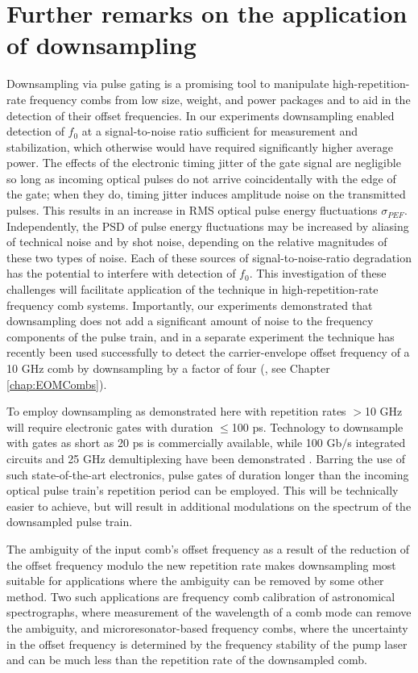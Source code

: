 \section{Further remarks on the application of downsampling}\label{sec:PPConclusion}
Downsampling via pulse gating is a promising tool to manipulate high-repetition-rate frequency combs from low size, weight, and power packages and to aid in the detection of their offset frequencies. In our experiments downsampling enabled detection of $f_0$ at a signal-to-noise ratio sufficient for measurement and stabilization, which otherwise would have required significantly higher average power. The effects of the electronic timing jitter of the gate signal are negligible so long as incoming optical pulses do not arrive coincidentally with the edge of the gate; when they do, timing jitter induces amplitude noise on the transmitted pulses. This results in an increase in RMS optical pulse energy fluctuations $\sigma_{PEF}$. Independently, the PSD of pulse energy fluctuations may be increased by aliasing of technical noise and by shot noise, depending on the relative magnitudes of these two types of noise. Each of these sources of signal-to-noise-ratio degradation has the potential to interfere with detection of $f_0$. This investigation of these challenges will facilitate application of the technique in high-repetition-rate frequency comb systems. Importantly, our experiments demonstrated that downsampling does not add a significant amount of noise to the frequency components of the pulse train, and in a separate experiment the technique has recently been used successfully to detect the carrier-envelope offset frequency of a 10 GHz comb by downsampling by a factor of four (\cite{Beha2017}, see Chapter \ref{chap:EOMCombs}).

To employ downsampling as demonstrated here with repetition rates $>$10 GHz will require electronic gates with duration $\leq$100 ps. Technology to downsample with gates as short as 20 ps is commercially available, while 100 Gb$/$s integrated circuits and 25 GHz demultiplexing have been demonstrated \cite{Driad2011,Ferenci2012}. Barring the use of such state-of-the-art electronics, pulse gates of duration longer than the incoming optical pulse train's repetition period can be employed.  This will be technically easier to achieve, but will result in additional modulations on the spectrum of the downsampled pulse train.

The ambiguity of the input comb's offset frequency as a result of the reduction of the offset frequency modulo the new repetition rate makes downsampling most suitable for applications where the ambiguity can be removed by some other method.  Two such applications are frequency comb calibration of astronomical spectrographs, where measurement of the wavelength of a comb mode can remove the ambiguity, and microresonator-based frequency combs, where the uncertainty in the offset frequency is determined by the frequency stability of the pump laser and can be much less than the repetition rate of the downsampled comb. 



